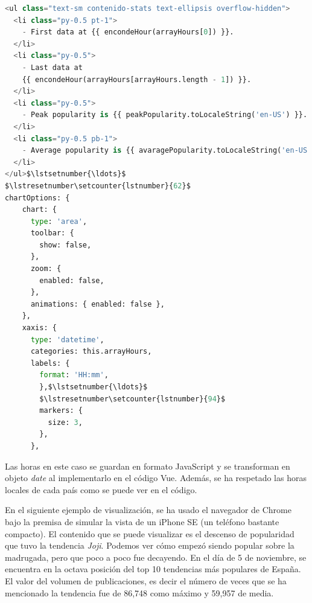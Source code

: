 \begin{lstlisting}[caption=Diferencias destacables de la implementación de la popularidad,language=Python, mathescape=true]
<ul class="text-sm contenido-stats text-ellipsis overflow-hidden">
  <li class="py-0.5 pt-1">
    - First data at {{ encondeHour(arrayHours[0]) }}.
  </li>
  <li class="py-0.5">
    - Last data at
    {{ encondeHour(arrayHours[arrayHours.length - 1]) }}.
  </li>
  <li class="py-0.5">
    - Peak popularity is {{ peakPopularity.toLocaleString('en-US') }}.
  </li>
  <li class="py-0.5 pb-1">
    - Average popularity is {{ avaragePopularity.toLocaleString('en-US') }}.
  </li>
</ul>$\lstsetnumber{\ldots}$
$\lstresetnumber\setcounter{lstnumber}{62}$
chartOptions: {
    chart: {
      type: 'area',
      toolbar: {
        show: false,
      },
      zoom: {
        enabled: false,
      },
      animations: { enabled: false },
    },
    xaxis: {
      type: 'datetime',
      categories: this.arrayHours,
      labels: {
        format: 'HH:mm',
        },$\lstsetnumber{\ldots}$
        $\lstresetnumber\setcounter{lstnumber}{94}$
        markers: {
          size: 3,
        },
      },
\end{lstlisting}

Las horas en este caso se guardan en formato JavaScript y se transforman en objeto \textit{date} al implementarlo en el código Vue. Además, se ha respetado las horas locales de cada país como se puede ver en el código.

\vspace{0.3cm}

En el siguiente ejemplo de visualización, se ha usado el navegador de Chrome bajo la premisa de simular la vista de un iPhone SE (un teléfono bastante compacto). El contenido que se puede visualizar es el descenso de popularidad que tuvo la tendencia \textit{Joji}. Podemos ver cómo empezó siendo popular sobre la madrugada, pero que poco a poco fue decayendo. En el día de 5 de noviembre, se encuentra en la octava posición del top 10 tendencias más populares de España. El valor del volumen de publicaciones, es decir el número de veces que se ha mencionado la tendencia fue de 86,748 como máximo y 59,957 de media.

